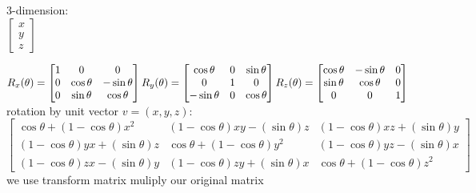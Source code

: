 3-dimension:\\
$\begin{bmatrix}
x\\
y\\
z
\end{bmatrix}$

$R_x(\theta) = \begin{bmatrix}
1 & 0 & 0 \\
      0 & \cos \theta & - \sin \theta \\
      0 & \sin \theta  &  \cos \theta \\
      \end{bmatrix} \\
      R_y(\theta) = \begin{bmatrix}
      \cos \theta & 0 & \sin \theta \\
          0 & 1 & 0 \\
          - \sin \theta & 0 & \cos \theta \\
          \end{bmatrix} \\
          R_z(\theta) = \begin{bmatrix}
          \cos \theta & - \sin \theta & 0 \\
              \sin \theta & \cos \theta & 0\\
              0 & 0 & 1\\
              \end{bmatrix}$\\
              rotation by unit vector ${v} = (x,y,z)$:\\
              $\begin{bmatrix}
              \cos \theta + (1 - \cos \theta) x^2
              & (1 - \cos \theta) x y - (\sin \theta) z 
              & (1 - \cos \theta) x z + (\sin \theta) y  
              \\
                  (1 - \cos \theta) y x + (\sin \theta) z 
                  & \cos \theta + (1 - \cos \theta) y^2
                  & (1 - \cos \theta) y z - (\sin \theta) x
                  \\
                      (1 - \cos \theta) z x - (\sin \theta) y
                      & (1 - \cos \theta) z y + (\sin \theta) x
                      & \cos \theta + (1 - \cos \theta) z^2 
                      \end{bmatrix}$ 
                      we use transform matrix muliply our original matrix\\

